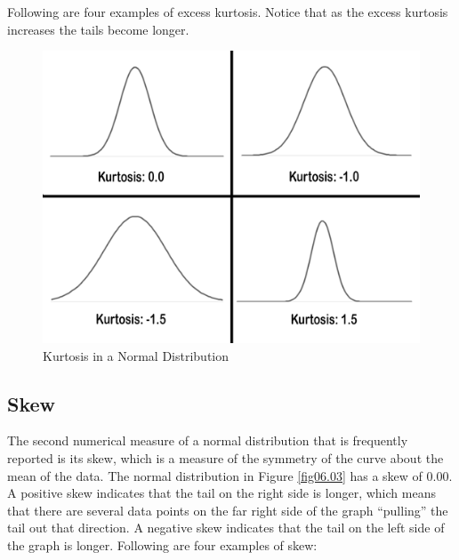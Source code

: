 Following are four examples of excess kurtosis. Notice that as the excess kurtosis increases the tails become longer. 

\begin{figure}[H]
	\centering
	\includegraphics[width=\maxwidth{.95\linewidth}]{gfx/06-Kurtosis}
	\caption{Kurtosis in a Normal Distribution}
	\label{fig06.02}
\end{figure}

\subsection{Skew}
The second numerical measure of a normal distribution that is frequently reported is its \gls{skew}, which is a measure of the symmetry of the curve about the mean of the data. The normal distribution in Figure \ref{fig06.03} has a skew of $ 0.00 $. A positive skew indicates that the tail on the right side is longer, which means that there are several data points on the far right side of the graph ``pulling'' the tail out that direction. A negative skew indicates that the tail on the left side of the graph is longer. Following are four examples of skew:

